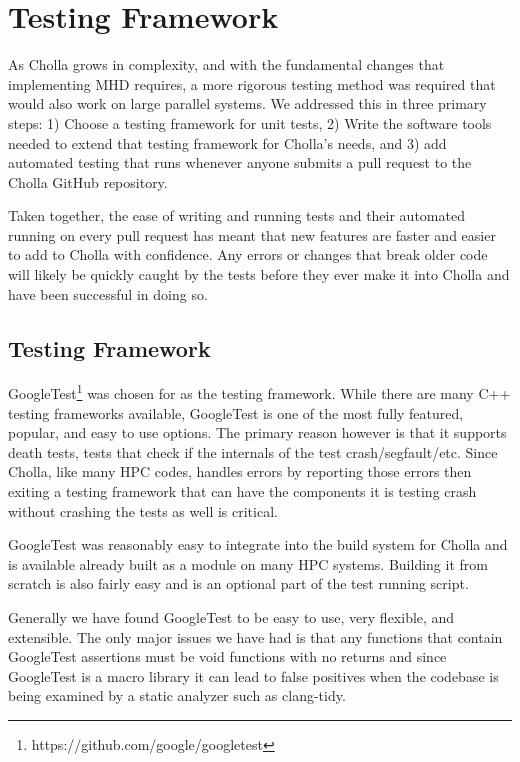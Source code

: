 \section{Testing Framework}
\label{sec:testing}

As Cholla grows in complexity, and with the fundamental changes that implementing MHD requires, a more rigorous testing method was required  that would also work on large parallel systems. We addressed this in three primary steps: 1) Choose a testing framework for unit tests, 2) Write the software tools needed to extend that testing framework for Cholla's needs, and 3) add automated testing that runs whenever anyone submits a pull request to the Cholla GitHub repository. 

Taken together, the ease of writing and running tests and their automated running on every pull request has meant that new features are faster and easier to add to Cholla with confidence. Any errors or changes that break older code will likely be quickly caught by the tests before they ever make it into Cholla and have been successful in doing so.

\subsection{Testing Framework}
\label{sec:testing-framework}

GoogleTest\footnote{https://github.com/google/googletest} was chosen for as the testing framework. While there are many C++ testing frameworks available, GoogleTest is one of the most fully featured, popular, and easy to use options. The primary reason however is that it supports death tests, tests that check if the internals of the test crash/segfault/etc. Since Cholla, like many HPC codes, handles errors by reporting those errors then exiting a testing framework that can have the components it is testing crash without crashing the tests as well is critical.

GoogleTest was reasonably easy to integrate into the build system for Cholla and is available already built as a module on many HPC systems. Building it from scratch is also fairly easy and is an optional part of the test running script.

Generally we have found GoogleTest to be easy to use, very flexible, and extensible. The only major issues we have had is that any functions that contain GoogleTest assertions must be void functions with no returns and since GoogleTest is a macro library it can lead to false positives when the codebase is being examined by a static analyzer such as clang-tidy.

